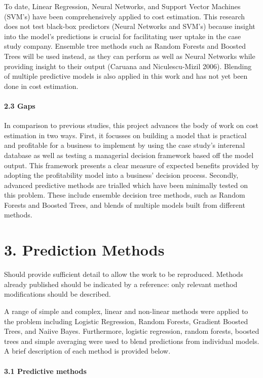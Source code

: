 \documentclass[]{elsarticle} %
\begin{document}
To date, Linear Regression, Neural Networks, and Support Vector Machines
(SVM's) have been comprehensively applied to cost estimation. This
research does not test black-box predictors (Neural Networks and SVM's)
because insight into the model's predictions is crucial for facilitating
user uptake in the case study company. Ensemble tree methods such as
Random Forests and Boosted Trees will be used instead, as they can
perform as well as Neural Networks while providing insight to their
output (Caruana and Niculescu-Mizil 2006). Blending of multiple
predictive models is also applied in this work and has not yet been done
in cost estimation.

\paragraph{2.3 Gaps}\label{gaps}

In comparison to previous studies, this project advances the body of
work on cost estimation in two ways. First, it focusses on building a
model that is practical and profitable for a business to implement by
using the case study's interenal database as well as testing a
managerial decision framework based off the model output. This framework
presents a clear measure of expected benefits provided by adopting the
profitability model into a business' decision process. Secondly,
advanced predictive methods are trialled which have been minimally
tested on this problem. These include ensemble decision tree methods,
such as Random Forests and Boosted Trees, and blends of multiple models
built from different methods.

\section{3. Prediction Methods}\label{prediction-methods}

Should provide sufficient detail to allow the work to be reproduced.
Methods already published should be indicated by a reference: only
relevant method modifications should be described.

A range of simple and complex, linear and non-linear methods were
applied to the problem including Logistic Regression, Random Forests,
Gradient Boosted Trees, and Naiive Bayes. Furthermore, logistic
regression, random forests, boosted trees and simple averaging were used
to blend predictions from individual models. A brief description of each
method is provided below.

\paragraph{3.1 Predictive methods}\label{predictive-methods}
\end{document}
